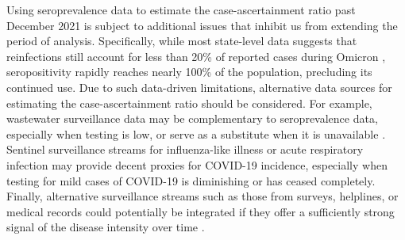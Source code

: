 
Using seroprevalence data to estimate the case-ascertainment ratio past December 2021
is subject to additional issues that inhibit us from extending the period of
analysis. Specifically, while most state-level data suggests that
reinfections still account for less than 20\% of reported cases during Omicron
\citep{ruff2022rapid, nyreinfect2021, hireinfect2022, wareinfect2022},
seropositivity rapidly reaches nearly 100\% of the population, precluding its
continued use. Due to such data-driven limitations, alternative data sources for estimating the
case-ascertainment ratio should be considered. For example, wastewater surveillance data
may be complementary to seroprevalence data, especially when testing is low,
or serve as a substitute when it is unavailable \citep{mcmanus2023predicting}.
Sentinel surveillance streams for influenza-like illness or acute respiratory
infection may provide decent proxies for COVID-19 incidence, especially when
testing for mild cases of COVID-19 is diminishing or has ceased completely.
Finally, alternative surveillance streams such as those from surveys, 
helplines, or medical records could potentially be
integrated if they offer a sufficiently strong signal of the disease intensity
over time \citep{reinhart2021open,ecdc2020strategies}.



